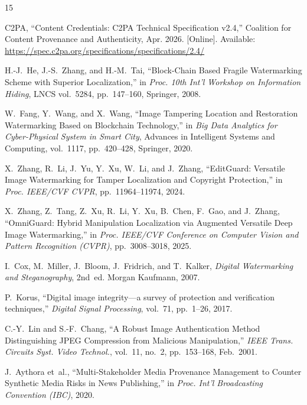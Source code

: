\documentclass[conference]{IEEEtran}
\begin{document}
\begin{thebibliography}{15}

  C2PA, ``Content Credentials: C2PA Technical Specification v2.4,''
  Coalition for Content Provenance and Authenticity, Apr. 2026. [Online].
  Available: \url{https://spec.c2pa.org/specifications/specifications/2.4/}

  H.-J.~He, J.-S.~Zhang, and H.-M.~Tai,
  ``Block-Chain Based Fragile Watermarking Scheme with Superior
  Localization,''
  in \emph{Proc. 10th Int'l Workshop on Information Hiding},
  LNCS vol.~5284, pp.~147--160, Springer, 2008.

  W.~Fang, Y.~Wang, and X.~Wang,
  ``Image Tampering Location and Restoration Watermarking Based on
  Blockchain Technology,''
  in \emph{Big Data Analytics for Cyber-Physical System in Smart City},
  Advances in Intelligent Systems and Computing, vol.~1117,
  pp.~420--428, Springer, 2020.

  X.~Zhang, R.~Li, J.~Yu, Y.~Xu, W.~Li, and J.~Zhang,
  ``EditGuard: Versatile Image Watermarking for Tamper Localization
  and Copyright Protection,''
  in \emph{Proc. IEEE/CVF CVPR}, pp.~11964--11974, 2024.

  X.~Zhang, Z.~Tang, Z.~Xu, R.~Li, Y.~Xu, B.~Chen, F.~Gao,
  and J.~Zhang,
  ``OmniGuard: Hybrid Manipulation Localization via Augmented Versatile
  Deep Image Watermarking,''
  in \emph{Proc. IEEE/CVF Conference on Computer Vision and Pattern
  Recognition (CVPR)}, pp.~3008--3018, 2025.

  I.~Cox, M.~Miller, J.~Bloom, J.~Fridrich, and T.~Kalker,
  \emph{Digital Watermarking and Steganography}, 2nd~ed.
  Morgan Kaufmann, 2007.

  P.~Korus,
  ``Digital image integrity---a survey of protection and verification
  techniques,''
  \emph{Digital Signal Processing}, vol.~71, pp.~1--26, 2017.

  C.-Y.~Lin and S.-F.~Chang,
  ``A Robust Image Authentication Method Distinguishing JPEG Compression
  from Malicious Manipulation,''
  \emph{IEEE Trans. Circuits Syst. Video Technol.},
  vol.~11, no.~2, pp.~153--168, Feb.~2001.

  J.~Aythora et~al.,
  ``Multi-Stakeholder Media Provenance Management to Counter Synthetic
  Media Risks in News Publishing,''
  in \emph{Proc. Int'l Broadcasting Convention (IBC)}, 2020.


\end{thebibliography}
\end{document}
